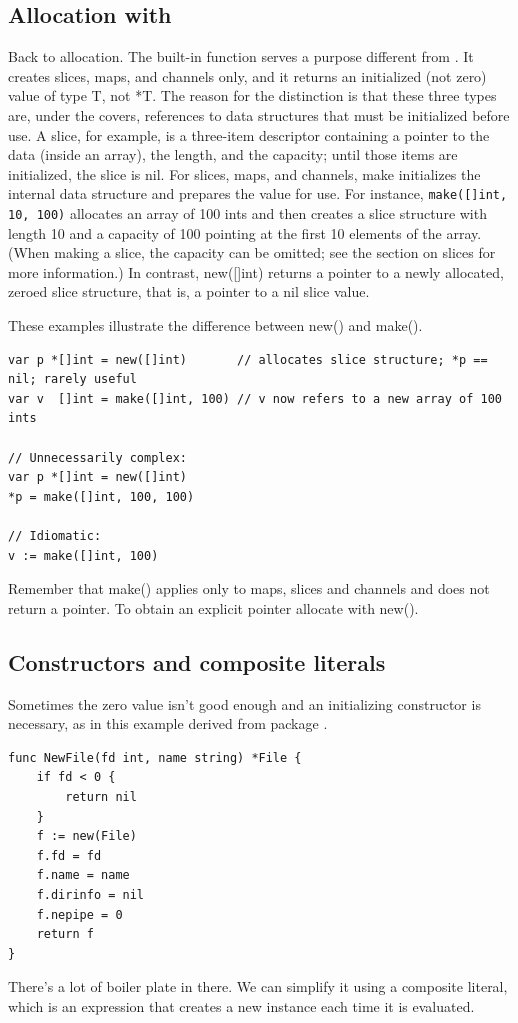 \subsection{Allocation with }
Back to allocation. The built-in function  serves a purpose
different from . It creates slices, maps, and channels only, and
it returns an initialized (not zero) value of type T, not *T. The reason
for the distinction is that these three types are, under the covers,
references to data structures that must be initialized before use. A
slice, for example, is a three-item descriptor containing a pointer to
the data (inside an array), the length, and the capacity; until those
items are initialized, the slice is nil. For slices, maps, and channels,
make initializes the internal data structure and prepares the value for
use. For instance,
\lstinline{make([]int, 10, 100)}
allocates an array of 100 ints and then creates a slice structure with
length 10 and a capacity of 100 pointing at the first 10 elements of the
array. (When making a slice, the capacity can be omitted; see the
section on slices for more information.) In contrast, new([]int) returns
a pointer to a newly allocated, zeroed slice structure, that is, a
pointer to a nil slice value.

These examples illustrate the difference between new() and make().
\begin{lstlisting}
var p *[]int = new([]int)       // allocates slice structure; *p == nil; rarely useful
var v  []int = make([]int, 100) // v now refers to a new array of 100 ints

// Unnecessarily complex:
var p *[]int = new([]int)
*p = make([]int, 100, 100)

// Idiomatic:
v := make([]int, 100)
\end{lstlisting}
Remember that make() applies only to maps, slices and channels and does
not return a pointer. To obtain an explicit pointer allocate with new().

\subsection{Constructors and composite literals}
Sometimes the zero value isn't good enough and an initializing
constructor is necessary, as in this example derived from package
.
\begin{lstlisting}
func NewFile(fd int, name string) *File {
    if fd < 0 {
        return nil
    }
    f := new(File)
    f.fd = fd
    f.name = name
    f.dirinfo = nil
    f.nepipe = 0
    return f
}
\end{lstlisting}
There's a lot of boiler plate in there. We can simplify it using a
composite literal, which is an expression that creates a new instance
each time it is evaluated.

